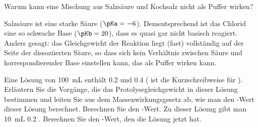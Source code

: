 \documentclass[DIV11]{scrartcl}
\begin{document}
\begin{question}[ID=HCl/NaCl]
Warum kann eine Mischung aus Salzsäure und Kochsalz nicht als Puffer wirken?
\end{question}
\begin{solution}
  Salzsäure ist eine starke Säure ($\pKa=-6$).  Dementsprechend ist das
  Chlorid  eine so schwache Base ($\pKb = 20$), dass es quasi gar
  nicht basisch reagiert.  Anders gesagt: das Gleichgewicht der Reaktion
   liegt
  (fast) vollständig auf der Seite der dissoziierten Säure, so dass sich kein
  Verhältnis zwischen Säure und korrespondierender Base einstellen kann, das
  als Puffer wirken kann.
\end{solution}

\begin{question}
\begin{tasks}
  \task Eine Lösung von \SI{100}{\milli\liter} enthält \SI{0.2}{\Molar}
     und \SI{0.4}{\Molar}  ( ist die
    Kurzschreibweise für ).  Erläutern Sie die Vorgänge, die das
    Protolysegleichgewicht in dieser Lösung bestimmen und leiten Sie aus dem
    Massenwirkungsgesetz ab, wie man den \pH-Wert dieser Lösung berechnet.
    Berechnen Sie den \pH-Wert.
  \task Zu dieser Lösung gibt man \SI{10}{\milli\liter} \SI{0.2}{\Molar}
    .  Berechnen Sie  den \pH-Wert, den die Lösung jetzt hat.
\end{tasks}
\end{question}
\end{document}
